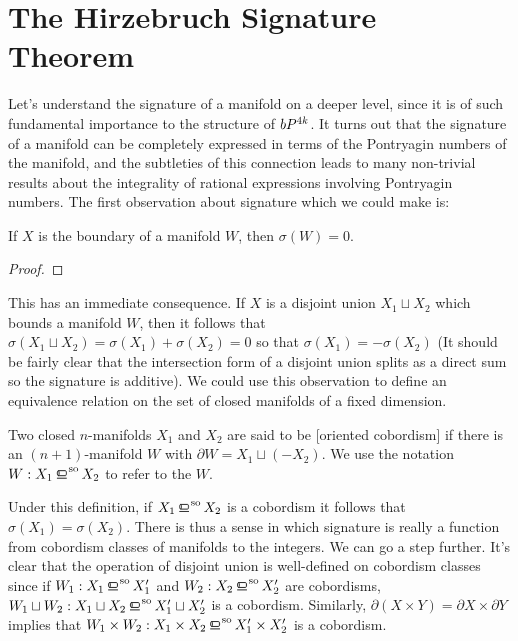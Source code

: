 \section{The Hirzebruch Signature Theorem}

Let's understand the signature of a manifold on a deeper level, since it is of such fundamental importance to the structure of $bP^{4k}$.  It turns out that the signature of a manifold can be completely expressed in terms of the Pontryagin numbers of the manifold, and the subtleties of this connection leads to many non-trivial results about the integrality of rational expressions involving Pontryagin numbers. The first observation about signature which we could make is:

\begin{proposition}
	If $X$ is the boundary of a manifold $W$, then $\sigma(W)=0$.
\end{proposition}
\begin{proof}
\end{proof}

This has an immediate consequence. If $X$ is a disjoint union $X_1\sqcup X_2$ which bounds a manifold $W$, then it follows that $\sigma(X_1\sqcup X_2)=\sigma(X_1)+\sigma(X_2)=0$ so that $\sigma(X_1)=-\sigma(X_2)$ (It should be fairly clear that the intersection form of a disjoint union splits as a direct sum so the signature is additive). We could use this observation to define an equivalence relation on the set of closed manifolds of a fixed dimension.

\begin{definition}
	Two closed $n$-manifolds $X_1$ and $X_2$ are said to be [oriented cobordism] if there is an $(n+1)$-manifold $W$ with $\partial W = X_1\sqcup (-X_2)$. We use the notation $W : X_1\sobord X_2$ to refer to the  $W$.
\end{definition}

Under this definition, if $X_1\sobord X_2$ is a cobordism it follows that $\sigma(X_1)=\sigma(X_2)$. There is thus a sense in which signature is really a function from cobordism classes of manifolds to the integers. We can go a step further. It's clear that the operation of disjoint union is well-defined on cobordism classes since if $W_1 : X_1 \sobord X_1'$ and $W_2 : X_2 \sobord X_2'$ are cobordisms, $W_1\sqcup W_2 : X_1\sqcup X_2 \sobord X_1'\sqcup X_2'$ is a cobordism. Similarly, $\partial (X\times Y) = \partial X\times \partial Y$ implies that $W_1\times W_2 : X_1\times X_2 \sobord X_1'\times X_2'$ is a cobordism.

